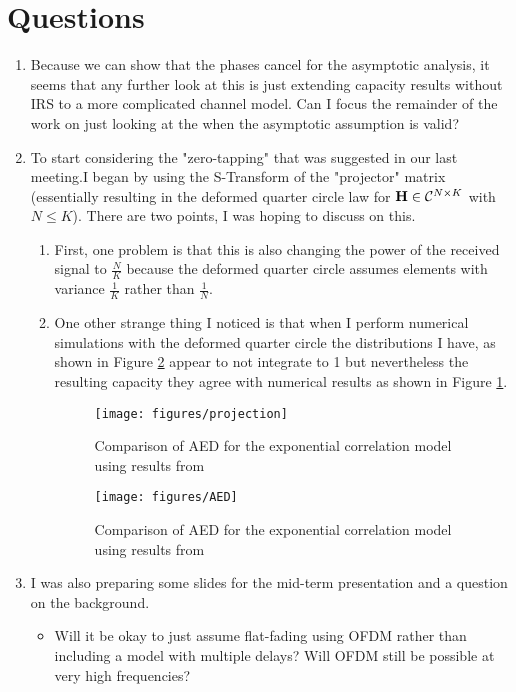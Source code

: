 \documentclass[12pt,a4paper]{report}
\begin{document}
\section{Questions}
\begin{enumerate}
\item
	Because we can show that the phases cancel for the asymptotic analysis, it seems that any further look at this is just extending capacity results without 
	IRS to a more complicated channel model. Can I focus the remainder of the work on just looking at the when the asymptotic assumption is valid?
\item
	To start considering the "zero-tapping" that was suggested in our last meeting.I began by using the S-Transform of the "projector" matrix (essentially resulting in the deformed quarter circle law for $\mathbf{H} \in \mathcal{C}^{N \times K}$ with $N \leq K$). There are two points, I was hoping to discuss on this.
	\begin{enumerate}
	\item
		First, one problem is that this is also changing the power of the received signal to $\frac{N}{K}$ 
		 because the deformed quarter circle assumes elements with variance $\frac{1}{K}$ rather than $\frac{1}{N}$.
\item
		One other strange thing I noticed is that when I perform numerical simulations with the deformed quarter circle the distributions I have, as shown in Figure \ref{AED} 
		appear to not integrate to 1 but nevertheless  the resulting capacity they agree with numerical results as shown in Figure \ref{projection}.
				\begin{figure}[H]
	\texttt{[image: figures/projection]}
	  \caption{Comparison of AED for the exponential correlation model using results from \cite{skupch2005free}}
	  \label{projection}
	\end{figure}
		\begin{figure}[H]
	\texttt{[image: figures/AED]}
	  \caption{Comparison of AED for the exponential correlation model using results from \cite{skupch2005free}}
	  	  \label{AED}
	\end{figure}

	\end{enumerate}
\item
I was also preparing some slides for the mid-term presentation and a question on the background.
\begin{itemize}
\item
	Will it be okay to just assume flat-fading using OFDM rather than including a model with multiple delays? Will OFDM still be possible at very high frequencies?
\end{itemize}
\end{enumerate}

\end{document}
